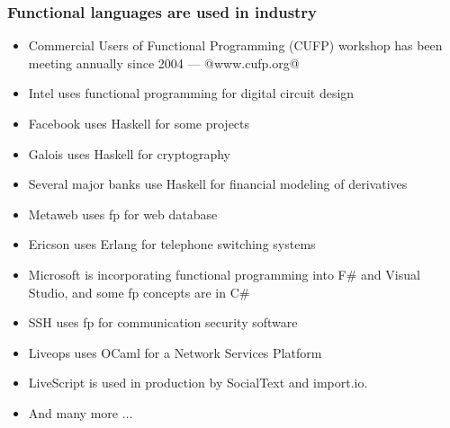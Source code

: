\documentclass{beamer}
\begin{document}
\begin{frame}
  \frametitle{Functional languages are used in industry}

\begin{itemize}
\item Commercial Users of Functional Programming (CUFP) workshop
  has been meeting annually since 2004 --- {\bluetext @www.cufp.org@}
  \item {\bluetext Intel} uses functional programming for {\redtext
      digital circuit design}
  \item {\bluetext Facebook} uses Haskell for some projects
  \item Galois uses Haskell for {\redtext cryptography}
  \item Several major {\bluetext banks} use Haskell for {\redtext
      financial modeling of derivatives}
  \item Metaweb uses fp for {\redtext web database}
  \item {\bluetext Ericson} uses Erlang for {\redtext telephone
      switching systems}
  \item {\bluetext Microsoft} is incorporating functional
    programming into {\redtext F\#} and {\redtext Visual Studio},
    and some fp concepts are in {\redtext C\#}
  \item SSH uses fp for {\redtext communication security software}
  \item Liveops uses OCaml for a {\redtext Network Services
      Platform}
  \item LiveScript is used in production by SocialText and import.io.      
  \item And many more $\ldots$
\end{itemize}

\end{frame}
\end{document}
